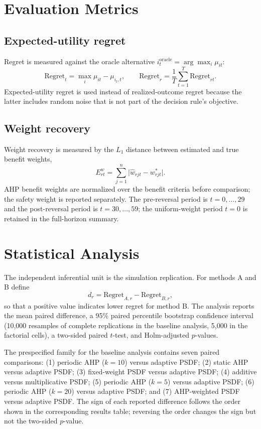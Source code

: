 \documentclass[12pt,a4paper]{article}
\begin{document}
\section{Evaluation Metrics}
\subsection{Expected-utility regret}
Regret is measured against the oracle alternative $i^{\mathrm{oracle}}_t=\arg\max_i\mu_{it}$:
\begin{equation}\mathrm{Regret}_t=\max_i\mu_{it}-\mu_{i_t,t},\qquad \mathrm{Regret}_r=\frac1T\sum_{t=1}^T\mathrm{Regret}_{rt}.\end{equation}
Expected-utility regret is used instead of realized-outcome regret because the latter includes random noise that is not part of the decision rule's objective.

\subsection{Weight recovery}
Weight recovery is measured by the $L_1$ distance between estimated and true benefit weights,
\begin{equation}E^w_{rt}=\sum_{j=1}^n\big|\hat w_{rjt}-w^*_{rjt}\big|.\end{equation}
AHP benefit weights are normalized over the benefit criteria before comparison; the safety weight is reported separately. The pre-reversal period is $t=0,\dots,29$ and the post-reversal period is $t=30,\dots,59$; the uniform-weight period $t=0$ is retained in the full-horizon summary.

\section{Statistical Analysis}
The independent inferential unit is the simulation replication. For methods A and B define
\begin{equation}d_r=\mathrm{Regret}_{A,r}-\mathrm{Regret}_{B,r},\end{equation}
so that a positive value indicates lower regret for method B. The analysis reports the mean paired difference, a 95\% paired percentile bootstrap confidence interval (10{,}000 resamples of complete replications in the baseline analysis, 5{,}000 in the factorial cells), a two-sided paired $t$-test, and Holm-adjusted $p$-values.

The prespecified family for the baseline analysis contains seven paired comparisons: (1) periodic AHP ($k=10$) versus adaptive PSDF; (2) static AHP versus adaptive PSDF; (3) fixed-weight PSDF versus adaptive PSDF; (4) additive versus multiplicative PSDF; (5) periodic AHP ($k=5$) versus adaptive PSDF; (6) periodic AHP ($k=20$) versus adaptive PSDF; and (7) AHP-weighted PSDF versus adaptive PSDF. The sign of each reported difference follows the order shown in the corresponding results table; reversing the order changes the sign but not the two-sided $p$-value.
\end{document}
